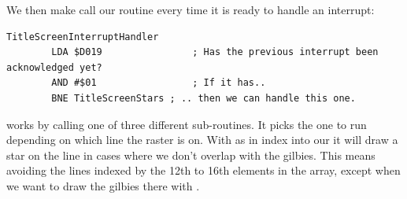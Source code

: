We then make  call our  routine every time
it is ready to handle an interrupt:
\begin{lstlisting}
TitleScreenInterruptHandler
        LDA $D019                ; Has the previous interrupt been acknowledged yet?
        AND #$01                 ; If it has.. 
        BNE TitleScreenStars ; .. then we can handle this one.
\end{lstlisting}

 works by calling one of three different
sub-routines. It picks the one to run depending on which line the raster is on.
With  as in index into our 
it will draw a star on the line in cases where we don't overlap with the gilbies. This
means avoiding the lines indexed by the 12th to 16th elements in the array, except when
we want to draw the gilbies there with . 


